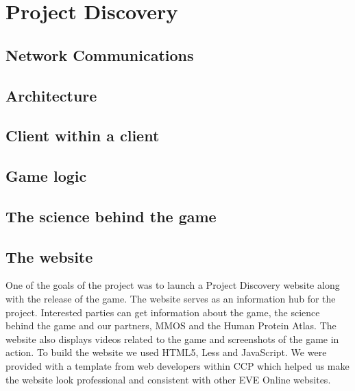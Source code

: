 \section{Project Discovery}\label{sec:projectdiscovery}

\subsection{Network Communications}

\subsection{Architecture}

\subsection{Client within a client}

\subsection{Game logic}

\subsection{The science behind the game}

\subsection{The website}
One of the goals of the project was to launch a Project Discovery website along with the release of the game. The website serves as an information hub for the project. Interested parties can get information about the game, the science behind the game and our partners, MMOS and the Human Protein Atlas. The website also displays videos related to the game and screenshots of the game in action. To build the website we used HTML5, Less and JavaScript. We were provided with a template from web developers within CCP which helped us make the website look professional and consistent with other EVE Online websites.